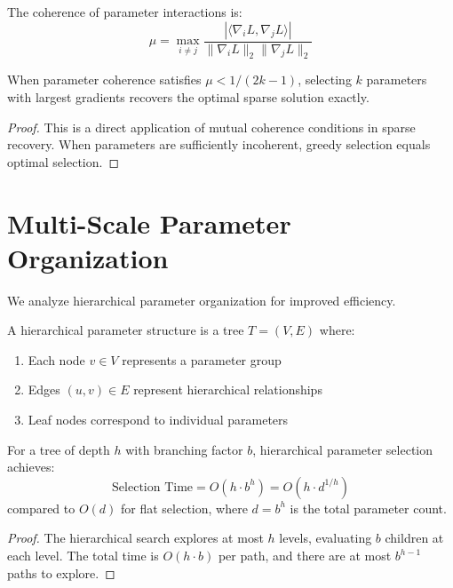 \begin{definition}
\label{def:coherence_measure}
The coherence of parameter interactions is:
$$\mu = \max_{i \neq j} \frac{|\langle \nabla_i L, \nabla_j L \rangle|}{\|\nabla_i L\|_2 \|\nabla_j L\|_2}$$
\end{definition}

\begin{theorem}
\label{thm:coherence_guarantee}
When parameter coherence satisfies $\mu < 1/(2k-1)$, selecting $k$ parameters with largest gradients recovers the optimal sparse solution exactly.
\end{theorem}

\begin{proof}
This is a direct application of mutual coherence conditions in sparse recovery. When parameters are sufficiently incoherent, greedy selection equals optimal selection.
\end{proof}

\section{Multi-Scale Parameter Organization}

We analyze hierarchical parameter organization for improved efficiency.

\begin{definition}
\label{def:hierarchical_structure}
A hierarchical parameter structure is a tree $T = (V, E)$ where:
\begin{enumerate}
\item Each node $v \in V$ represents a parameter group
\item Edges $(u,v) \in E$ represent hierarchical relationships
\item Leaf nodes correspond to individual parameters
\end{enumerate}
\end{definition}

\begin{theorem}
\label{thm:hierarchical_efficiency}
For a tree of depth $h$ with branching factor $b$, hierarchical parameter selection achieves:
$$\text{Selection Time} = O(h \cdot b^h) = O(h \cdot d^{1/h})$$
compared to $O(d)$ for flat selection, where $d = b^h$ is the total parameter count.
\end{theorem}

\begin{proof}
The hierarchical search explores at most $h$ levels, evaluating $b$ children at each level. The total time is $O(h \cdot b)$ per path, and there are at most $b^{h-1}$ paths to explore.
\end{proof}

